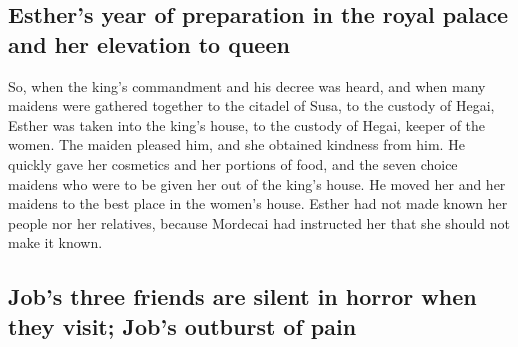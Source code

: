 \hypertarget{esthers-year-of-preparation-in-the-royal-palace-and-her-elevation-to-queen}{%
\subsection{Esther's year of preparation in the royal palace and her
elevation to
queen}\label{esthers-year-of-preparation-in-the-royal-palace-and-her-elevation-to-queen}}

 So, when the king's commandment and his decree was heard,
and when many maidens were gathered together to the citadel of Susa, to
the custody of Hegai, Esther was taken into the king's house, to the
custody of Hegai, keeper of the women.  The maiden pleased
him, and she obtained kindness from him. He quickly gave her cosmetics
and her portions of food, and the seven choice maidens who were to be
given her out of the king's house. He moved her and her maidens to the
best place in the women's house.  Esther had not made
known her people nor her relatives, because Mordecai had instructed her
that she should not make it known.

\hypertarget{jobs-three-friends-are-silent-in-horror-when-they-visit-jobs-outburst-of-pain}{%
\subsection{Job's three friends are silent in horror when they visit;
Job's outburst of
pain}\label{jobs-three-friends-are-silent-in-horror-when-they-visit-jobs-outburst-of-pain}}

